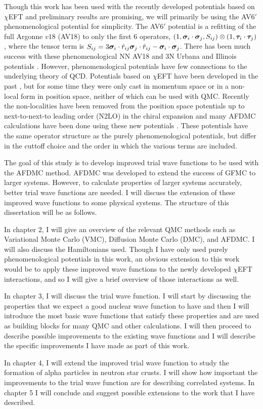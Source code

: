 Though this work has been used with the recently developed potentials based on $\chi$EFT and preliminary results are promising, we will primarily be using the AV6$'$ phenomenological potential for simplicity. The AV6$'$ potential is a refitting of the full Argonne $v18$ (AV18) \cite{wiringa1995} to only the first 6 operators, $(1,\bm{\sigma}_i\cdot\bm{\sigma}_j,S_{ij})\otimes(1,\bm{\tau}_i\cdot\bm{\tau}_j)$, where the tensor term is $S_{ij} = 3\bm{\sigma}_i\cdot\hat{r}_{ij}\bm{\sigma}_j\cdot\hat{r}_{ij}-\bm{\sigma}_i\cdot\bm{\sigma}_j$. There has been much success with these phenomenological NN AV18 and 3N Urbana \cite{carlson1983} and Illinois potentials \cite{pieper2001}. However, phenomenological potentials have few connections to the underlying theory of QCD. Potentials based on $\chi$EFT have been developed in the past \cite{epelbaum2009}, but for some time they were only cast in momentum space or in a non-local form in position space, neither of which can be used with QMC. Recently the non-localities have been removed from the position space potentials up to next-to-next-to leading order (N2LO) in the chiral expansion and many AFDMC calculations have been done using these new potentials \cite{gezerlis2013}. These potentials have the same operator structure as the purely phenomenological potentials, but differ in the cuttoff choice and the order in which the various terms are included.

The goal of this study is to develop improved trial wave functions to be used with the AFDMC method. AFDMC was developed to extend the success of GFMC to larger systems. However, to calculate properties of larger systems accurately, better trial wave functions are needed. I will discuss the extension of these improved wave functions to some physical systems. The structure of this dissertation will be as follows.

In chapter 2, I will give an overview of the relevant QMC methods such as Variational Monte Carlo (VMC), Diffusion Monte Carlo (DMC), and AFDMC. I will also discuss the Hamiltonians used. Though I have only used purely phenomenological potentials in this work, an obvious extension to this work would be to apply these improved wave functions to the newly developed $\chi$EFT interactions, and so I will give a brief overview of those interactions as well.

In chapter 3, I will discuss the trial wave function. I will start by discussing the properties that we expect a good nuclear wave function to have and then I will introduce the most basic wave functions that satisfy these properties and are used as building blocks for many QMC and other calculations. I will then proceed to describe possible improvements to the existing wave functions and I will describe the specific improvements I have made as part of this work.

In chapter 4, I will extend the improved trial wave function to study the formation of alpha particles in neutron star crusts. I will show how important the improvements to the trial wave function are for describing correlated systems. In chapter 5 I will conclude and suggest possible extensions to the work that I have described.
